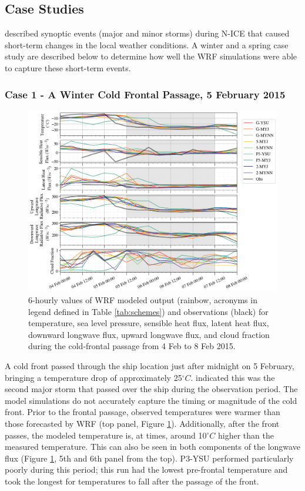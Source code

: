 \subsection{Case Studies}
\citet{cohen:2015} described synoptic events (major and minor storms) during N-ICE that caused short-term changes in the local weather conditions. A winter and a spring case study are described below to determine how well the WRF simulations were able to capture these short-term events.

\subsubsection{Case 1 - A Winter Cold Frontal Passage, 5 February 2015}
\begin{figure}[p]
    \centering \hspace*{-0.75cm}
    \includegraphics[width=1.1\linewidth]{figures/chapter3/wrf_case1.png}
    \caption[Polar WRF Case 1 - Winter cold front (5 Feb 2015) time series]{6-hourly values of WRF modeled output (rainbow, acronyms in legend defined in Table \ref{tab:schemes}) and observations (black) for temperature, sea level pressure, sensible heat flux, latent heat flux, downward longwave flux, upward longwave flux, and cloud fraction during the cold-frontal passage from 4 Feb to 8 Feb 2015.}
    \label{fig:wrf_case1}
\end{figure}

A cold front passed through the ship location just after midnight on 5 February, bringing a temperature drop of approximately 25$^{\circ}C$. \citet{cohen:2017} indicated this was the second major storm that passed over the ship during the observation period. The model simulations do not accurately capture the timing or magnitude of the cold front. Prior to the frontal passage, observed temperatures were warmer than those forecasted by WRF (top panel, Figure \ref{fig:wrf_case1}). Additionally, after the front passes, the modeled temperature is, at times, around 10$^{\circ}C$ higher than the measured temperature. This can also be seen in both components of the longwave flux (Figure \ref{fig:wrf_case1}, 5th and 6th panel from the top). P3-YSU performed particularly poorly during this period; this run had the lowest pre-frontal temperature and took the longest for temperatures to fall after the passage of the front.

